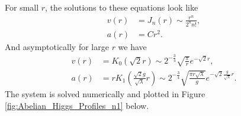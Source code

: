     \indent For small $r$, the solutions to these equations look like
    \begin{align}
        v(r)&= J_n(r) \sim \frac{r^n}{ 2^n n!}, \\
        a(r)&= C r^2.
    \end{align}
    And asymptotically for large $r$ we have
    \begin{align}
        v(r)&=K_0\left(\sqrt{2} r\right)\sim 2^{-\frac{3}{4}}\sqrt{\frac{\pi}{r}} e^{- \sqrt{2} r} , \label{eq:Asymptotics1_Abelian_Higgs} \\
        a(r)&=r K_1\left(\frac{\sqrt{2} g}{\sqrt{\lambda}} r \right)\sim 2^{- \frac{3}{4}} \sqrt{\frac{\pi r \sqrt{\lambda}}{g}} e^{- \sqrt{2} \frac{g}{\sqrt{\lambda}}r}. \label{eq:Asymptotics2_Abelian_Higgs}
    \end{align}
    The system is solved numerically and plotted in Figure \ref{fig:Abelian_Higgs_Profiles_n1} below.

